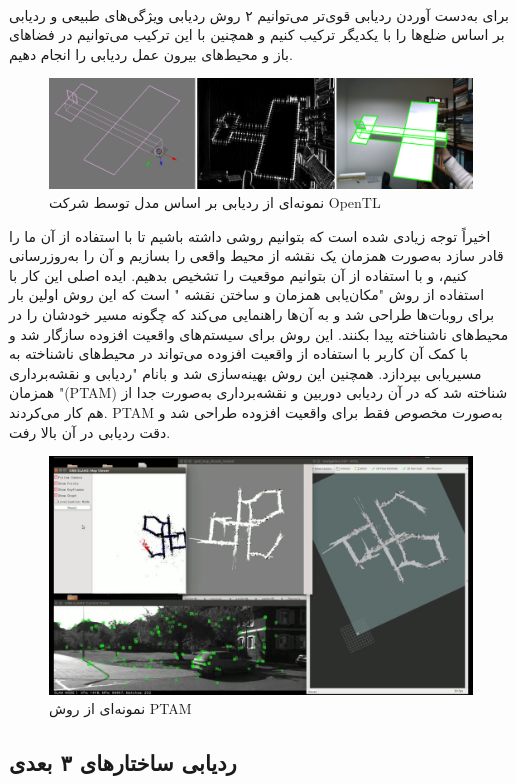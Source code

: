 \begin{itemize}
	\\
	برای به‌دست آوردن ردیابی قوی‌تر می‌توانیم ۲ روش ردیابی ویژگی‌های طبیعی و ردیابی بر اساس ضلع‌ها را با یکدیگر ترکیب کنیم\cite{vacchetti2003fusing} و همچنین با این ترکیب می‌توانیم در فضاهای باز و محیط‌های بیرون عمل ردیابی را انجام دهیم\cite{comport2006real}.
	\begin{figure}
		\centering
		\includegraphics[width=1\linewidth]{image/mbt}
		\caption {نمونه‌ای از ردیابی بر اساس مدل توسط شرکت OpenTL   \cite{mbt}}
		\label{fig:ptam}
	\end{figure}
	اخیراً توجه زیادی شده است که بتوانیم روشی داشته باشیم تا با استفاده از آن ما را قادر سازد به‌صورت همزمان یک نقشه از محیط واقعی را بسازیم و آن را به‌روزرسانی کنیم، و با استفاده از آن بتوانیم موقعیت را تشخیص بدهیم. ایده اصلی این کار با استفاده از روش "مکان‌یابی همزمان و ساختن نقشه " است که این روش اولین بار برای روبات‌ها طراحی شد\cite{dissanayake2001solution} و به آن‌ها راهنمایی می‌کند که چگونه مسیر خودشان را در محیط‌های ناشناخته پیدا بکنند. این روش برای سیستم‌های واقعیت افزوده سازگار شد و با کمک آن کاربر با استفاده از واقعیت افزوده می‌تواند در محیط‌های ناشناخته به مسیریابی بپردازد. همچنین این روش بهینه‌سازی شد و بانام "ردیابی و نقشه‌برداری همزمان "(PTAM) شناخته شد که در آن ردیابی دوربین و نقشه‌برداری به‌صورت جدا از هم کار می‌کردند. PTAM به‌صورت مخصوص فقط برای واقعیت افزوده طراحی شد و دقت ردیابی در آن بالا رفت\cite{davison2007monoslam}.
		\begin{figure}
		\centering
		\includegraphics[width=1\linewidth]{image/ptam}
		\caption {نمونه‌ای از روش PTAM    \cite{murORB2}}
		\label{fig:ptam}
	\end{figure}
	
\end{itemize}

\subsection{ردیابی ساختارهای ۳ بعدی\protect{}}





